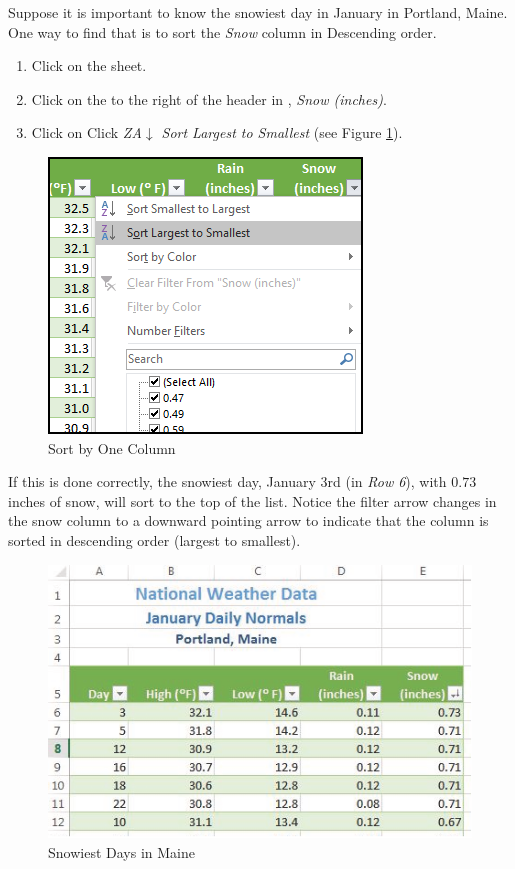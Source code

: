 Suppose it is important to know the snowiest day in January in Portland, Maine. One way to find that is to sort the \textit{Snow} column in Descending order.

\begin{enumbox}
	\begin{enumerate}
		\item Click on the  sheet.
		\item Click on the  to the right of the header in , \textit{Snow (inches)}.
		\item Click on Click \textit{ZA$ \downarrow $ Sort Largest to Smallest} (see Figure \ref{05:fig08}).
	\end{enumerate}
\end{enumbox}
	
\begin{figure}[H]
	\centering
	\includegraphics[width=\maxwidth{.65\linewidth}]{gfx/ch05_fig08}
	\caption{Sort by One Column}
	\label{05:fig08}
\end{figure}

If this is done correctly, the snowiest day, January 3rd (in \textit{Row 6}), with $ 0.73 $ inches of snow, will sort to the top of the list. Notice the filter arrow changes in the snow column to a downward pointing arrow to indicate that the column is sorted in descending order (largest to smallest).

\begin{figure}[H]
	\centering
	\includegraphics[width=\maxwidth{.95\linewidth}]{gfx/ch05_fig09}
	\caption{Snowiest Days in Maine}
	\label{05:fig09}
\end{figure}

